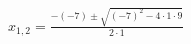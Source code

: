 \documentclass[preview]{standalone}
\begin{document}
\begin{align*}
x_{1, 2} = \frac{-(-7) \pm \sqrt{(-7)^2-4 \cdot 1 \cdot 9}}{2\cdot 1}
\end{align*}
\end{document}
